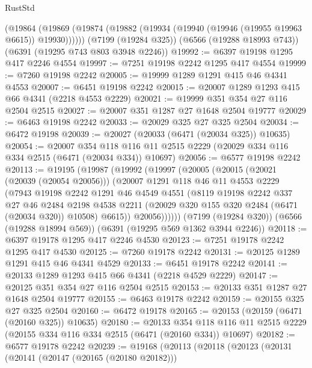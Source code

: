 \begin{lexlean}{RustStd}
\begin{coremodule}
{\begin{coremodule}
{{{{{{{{{{{{{{{{{{{{{{{{{{    (@19864 (@19869 (@19874 (@19882 (@19934 (@19940 (@19946 (@19955 @19963 @6615)) @19930))))))
    (@7199 (@19284 @325))
    (@6566 (@19288 @18993 @743))
    (@6391 (@19295 @743 @803 @3948 @2246))
@19992 := @6397 @19198 @1295 @417 @2246 @4554
@19997 := @7251 @19198 @2242 @1295 @417 @4554
@19999 := @7260 @19198 @2242
@20005 := @19999 @1289 @1291 @415 @46 @4341 @4553
@20007 := @6451 @19198 @2242
@20015 := @20007 @1289 @1293 @415 @66 @4341 (@2218 @4553 @2229)
@20021 := @19999 @351 @354 @27 @116 @2504 @2515
@20027 := @20007 @351 @1287 @27 @1648 @2504 @19777
@20029 := @6463 @19198 @2242
@20033 := @20029 @325 @27 @325 @2504
@20034 := @6472 @19198
@20039 := @20027 (@20033 (@6471 (@20034 @325)) @10635)
@20054 := @20007
    @354
    @118
    @116
    @11
    @2515
    @2229
    (@20029 @334 @116 @334 @2515 (@6471 (@20034 @334)) @10697)
@20056 := @6577 @19198 @2242
@20113 := @19195
    (@19987
      (@19992
        (@19997
          (@20005
            (@20015
              (@20021 (@20039 (@20054 @20056)))
              (@20007
                @1291
                @118
                @46
                @11
                @4553
                @2229
                (@7943
                  @19198
                  @2242
                  @1291
                  @46
                  @4549
                  @4551
                  (@8119
                    @19198
                    @2242
                    @337
                    @27
                    @46
                    @2484
                    @2198
                    @4538
                    @2211
                    (@20029 @320 @155 @320 @2484 (@6471 (@20034 @320)) @10508)
                    @6615))
                @20056))))))
    (@7199 (@19284 @320))
    (@6566 (@19288 @18994 @569))
    (@6391 (@19295 @569 @1362 @3944 @2246))
@20118 := @6397 @19178 @1295 @417 @2246 @4530
@20123 := @7251 @19178 @2242 @1295 @417 @4530
@20125 := @7260 @19178 @2242
@20131 := @20125 @1289 @1291 @415 @46 @4341 @4529
@20133 := @6451 @19178 @2242
@20141 := @20133 @1289 @1293 @415 @66 @4341 (@2218 @4529 @2229)
@20147 := @20125 @351 @354 @27 @116 @2504 @2515
@20153 := @20133 @351 @1287 @27 @1648 @2504 @19777
@20155 := @6463 @19178 @2242
@20159 := @20155 @325 @27 @325 @2504
@20160 := @6472 @19178
@20165 := @20153 (@20159 (@6471 (@20160 @325)) @10635)
@20180 := @20133
    @354
    @118
    @116
    @11
    @2515
    @2229
    (@20155 @334 @116 @334 @2515 (@6471 (@20160 @334)) @10697)
@20182 := @6577 @19178 @2242
@20239 := @19168
    (@20113
      (@20118
        (@20123
          (@20131
            (@20141
              (@20147 (@20165 (@20180 @20182)))
}}}}}}}}}}}}}}}}}}}}}}}}}}
\end{coremodule}}
\end{coremodule}
\end{lexlean}
